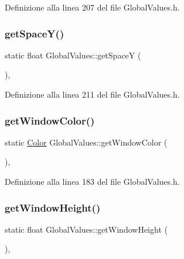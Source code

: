 Definizione alla linea 207 del file Global\+Values.\+h.

\mbox{\label{class_global_values_a12285e65138f9ff5679655ee17285156}} 
\subsubsection{\texorpdfstring{get\+Space\+Y()}{getSpaceY()}}
{\footnotesize\ttfamily static float Global\+Values\+::get\+SpaceY (\begin{DoxyParamCaption}{ }\end{DoxyParamCaption})\hspace{0.3cm}{\ttfamily [inline]}, {\ttfamily [static]}}



Definizione alla linea 211 del file Global\+Values.\+h.

\mbox{\label{class_global_values_aa1d8542a6a0b370669902199ae89c7d3}} 
\subsubsection{\texorpdfstring{get\+Window\+Color()}{getWindowColor()}}
{\footnotesize\ttfamily static \hyperlink{struct_color}{Color} Global\+Values\+::get\+Window\+Color (\begin{DoxyParamCaption}{ }\end{DoxyParamCaption})\hspace{0.3cm}{\ttfamily [inline]}, {\ttfamily [static]}}



Definizione alla linea 183 del file Global\+Values.\+h.

\mbox{\label{class_global_values_af40b90ec655cadffce663e011b4bde45}} 
\subsubsection{\texorpdfstring{get\+Window\+Height()}{getWindowHeight()}}
{\footnotesize\ttfamily static float Global\+Values\+::get\+Window\+Height (\begin{DoxyParamCaption}{ }\end{DoxyParamCaption})\hspace{0.3cm}{\ttfamily [inline]}, {\ttfamily [static]}}




